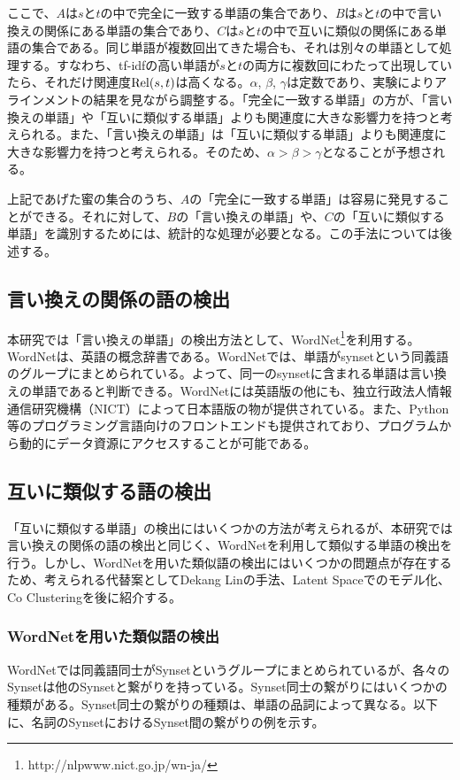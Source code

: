 \documentclass[12pt]{jarticle}
\begin{document}
ここで、$A$は$s$と$t$の中で完全に一致する単語の集合であり、$B$は$s$と$t$の中で言い換えの関係にある単語の集合であり、$C$は$s$と$t$の中で互いに類似の関係にある単語の集合である。同じ単語が複数回出てきた場合も、それは別々の単語として処理する。すなわち、tf-idfの高い単語が$s$と$t$の両方に複数回にわたって出現していたら、それだけ関連度${\rm Rel}(s, t)$は高くなる。$\alpha$, $\beta$, $\gamma$は定数であり、実験によりアラインメントの結果を見ながら調整する。「完全に一致する単語」の方が、「言い換えの単語」や「互いに類似する単語」よりも関連度に大きな影響力を持つと考えられる。また、「言い換えの単語」は「互いに類似する単語」よりも関連度に大きな影響力を持つと考えられる。そのため、$\alpha > \beta > \gamma$となることが予想される。

上記であげた蜜の集合のうち、$A$の「完全に一致する単語」は容易に発見することができる。それに対して、$B$の「言い換えの単語」や、$C$の「互いに類似する単語」を識別するためには、統計的な処理が必要となる。この手法については後述する。

\subsection{言い換えの関係の語の検出}
本研究では「言い換えの単語」の検出方法として、WordNet\footnote{http://nlpwww.nict.go.jp/wn-ja/}を利用する。WordNetは、英語の概念辞書である。WordNetでは、単語がsynsetという同義語のグループにまとめられている。よって、同一のsynsetに含まれる単語は言い換えの単語であると判断できる。WordNetには英語版の他にも、独立行政法人情報通信研究機構（NICT）によって日本語版の物が提供されている。また、Python等のプログラミング言語向けのフロントエンドも提供されており、プログラムから動的にデータ資源にアクセスすることが可能である。

\subsection{互いに類似する語の検出}
「互いに類似する単語」の検出にはいくつかの方法が考えられるが、本研究では言い換えの関係の語の検出と同じく、WordNetを利用して類似する単語の検出を行う。しかし、WordNetを用いた類似語の検出にはいくつかの問題点が存在するため、考えられる代替案としてDekang Linの手法\cite{DekangLin}、Latent Spaceでのモデル化\cite{LatentSpace}、Co Clustering\cite{CoClustering}を後に紹介する。

\subsubsection{WordNetを用いた類似語の検出}
WordNetでは同義語同士がSynsetというグループにまとめられているが、各々のSynsetは他のSynsetと繋がりを持っている。Synset同士の繋がりにはいくつかの種類がある。Synset同士の繋がりの種類は、単語の品詞によって異なる。以下に、名詞のSynsetにおけるSynset間の繋がりの例を示す。
\end{document}
